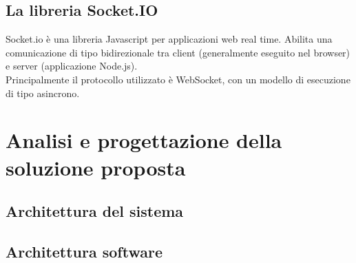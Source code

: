 \documentclass[12pt]{article}
\begin{document}
\subsection{La libreria Socket.IO}

Socket.io è una libreria Javascript per applicazioni web real time. Abilita una comunicazione di tipo bidirezionale tra client (generalmente eseguito nel browser) e server (applicazione Node.js).\\

Principalmente il protocollo utilizzato è WebSocket, con un modello di esecuzione di tipo asincrono.  

\section{Analisi e progettazione della soluzione proposta}
\subsection {Architettura del sistema}

\subsection {Architettura software}
\end{document}
